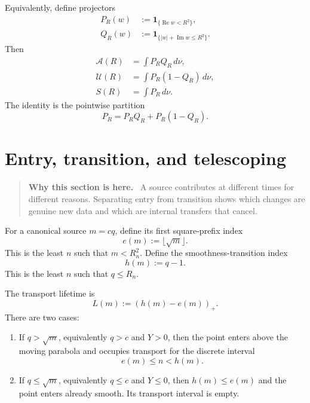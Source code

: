 \documentclass[11pt]{article}
\theoremstyle{definition}
\theoremstyle{remark}
\newcommand{\1}{\mathbf{1}}
\newcommand{\Repart}{\operatorname{Re}}
\newcommand{\Impart}{\operatorname{Im}}
\newenvironment{motivation}
  {\begin{quote}\small\color{ovvogray}\textbf{Why this section is here.}\ }
  {\end{quote}}
\begin{document}
Equivalently, define projectors
\begin{align}
 P_R(w)&:=\1_{\{\Repart w<R^2\}},
 \label{eq:P-projector}\\
 Q_R(w)&:=\1_{\{|w|+\Impart w\le R^2\}}.
 \label{eq:Q-projector}
\end{align}
Then
\begin{align}
 \mathcal A(R)&=\int P_RQ_R\,d\nu,
 \label{eq:A-projector}\\
 \mathcal U(R)&=\int P_R(1-Q_R)\,d\nu,
 \label{eq:U-projector}\\
 S(R)&=\int P_R\,d\nu.
 \label{eq:S-projector}
\end{align}
The identity is the pointwise partition
\begin{equation}
 P_R=P_RQ_R+P_R(1-Q_R).
 \label{eq:projector-partition}
\end{equation}

\section{Entry, transition, and telescoping}
\label{sec:telescoping}

\begin{motivation}
A source contributes at different times for different reasons.  Separating entry from transition shows which changes are genuine new data and which are internal transfers that cancel.
\end{motivation}

For a canonical source $m=cq$, define its first square-prefix index
\begin{equation}
 e(m):=\lfloor\sqrt m\rfloor.
 \label{eq:entry-index}
\end{equation}
This is the least $n$ such that $m<R_n^2$.  Define the smoothness-transition index
\begin{equation}
 h(m):=q-1.
 \label{eq:transition-index}
\end{equation}
This is the least $n$ such that $q\le R_n$.

The transport lifetime is
\begin{equation}
 L(m):=(h(m)-e(m))_+.
 \label{eq:lifetime}
\end{equation}
There are two cases:

\begin{enumerate}[leftmargin=1.7em,itemsep=0.3em]
\item If $q>\sqrt m$, equivalently $q>c$ and $Y>0$, then the point enters above the moving parabola and occupies transport for the discrete interval
\[
 e(m)\le n<h(m).
\]
\item If $q\le\sqrt m$, equivalently $q\le c$ and $Y\le0$, then $h(m)\le e(m)$ and the point enters already smooth.  Its transport interval is empty.
\end{enumerate}
\end{document}
